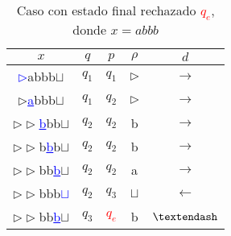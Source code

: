\documentclass[letterpaper,11pt]{article}
\begin{document}
\begin{table}[h!]
\centering
\begin{tabular}{c|c|c|c|c}
\hline
$x$ & $q$ & $p$ & $\rho$ & $d$ \\ \hline
\textcolor{blue}{\underline{$\rhd$}}abbb$\sqcup$  & $q_1$ & $q_1$ & $\rhd$ & $\rightarrow$  \\
$\rhd$\textcolor{blue}{\underline{a}}bbb$\sqcup$  & $q_1$ & $q_2$ & $\rhd$ & $\rightarrow$  \\
$\rhd\rhd$\textcolor{blue}{\underline{b}}bb$\sqcup$  & $q_2$ & $q_2$ & b & $\rightarrow$  \\
$\rhd\rhd$b\textcolor{blue}{\underline{b}}b$\sqcup$  & $q_2$ & $q_2$ & b & $\rightarrow$  \\
$\rhd\rhd$bb\textcolor{blue}{\underline{b}}$\sqcup$  & $q_2$ & $q_2$ & a & $\rightarrow$  \\
$\rhd\rhd$bbb\textcolor{blue}{\underline{$\sqcup$}}  & $q_2$ & $q_3$ & $\sqcup$ & $\leftarrow$  \\
$\rhd\rhd$bb\textcolor{blue}{\underline{b}}$\sqcup$  & $q_3$ & \textcolor{red}{$q_e$} & b & $\textendash$  \\\hline
\end{tabular}
\caption{Caso con estado final rechazado \textcolor{red}{$q_e$}, donde $x=abbb$}
\end{table}
\end{document}
